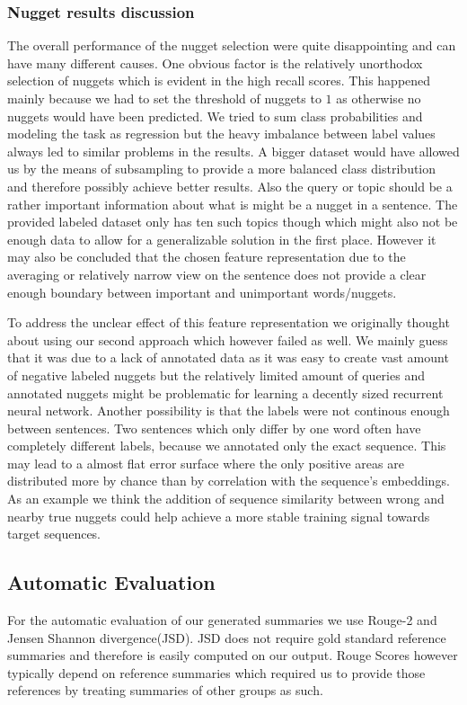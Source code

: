 \documentclass{article}
\begin{document}
\subsubsection{Nugget results discussion}
The overall performance of the nugget selection were quite disappointing and can have many different causes. One obvious factor is the relatively unorthodox selection of nuggets which is evident in the high recall scores. This happened mainly because we had to set the threshold of nuggets to $1$ as otherwise no nuggets would have been predicted. We tried to sum class probabilities and modeling the task as regression but the heavy imbalance between label values always led to similar problems in the results. A bigger dataset would have allowed us by the means of subsampling to provide a more balanced class distribution and therefore possibly achieve better results. Also the query or topic should be a rather important information about what is might be a nugget in a sentence. The provided labeled dataset only has ten such topics though which might also not be enough data to allow for a generalizable solution in the first place.  However it may also be concluded that the chosen feature representation due to the averaging or relatively narrow view on the sentence does not provide a clear enough boundary between important and unimportant words/nuggets.

To address the unclear effect of this feature representation we originally thought about using our second approach which however failed as well. We mainly guess that it was due to a lack of annotated data as it was easy to create vast amount of negative labeled nuggets but the relatively limited amount of queries and annotated nuggets might be problematic for learning a decently sized recurrent neural network. Another possibility is that the labels were not continous enough between sentences. Two sentences which only differ by one word often have completely different labels, because we annotated only the exact sequence. This may lead to a almost flat error surface where the only positive areas are distributed more by chance than by correlation with the sequence's embeddings. As an example we think the addition of sequence similarity between wrong and nearby true nuggets could help achieve a more stable training signal towards target sequences.
\subsection{Automatic Evaluation}
For the automatic evaluation of our generated summaries we use Rouge-2 and Jensen Shannon divergence(JSD). JSD does not require gold standard reference summaries and therefore is easily computed on our output. Rouge Scores however typically depend on reference summaries which required us to provide those references by treating summaries of other groups as such. 
\end{document}
